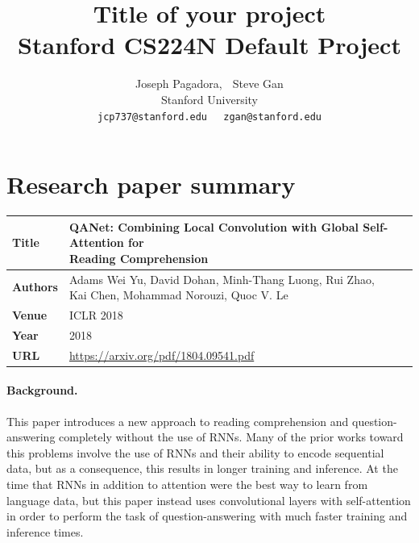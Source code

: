\documentclass{article}
\title{
  Title of your project \\
  \vspace{1em}
  \small{\normalfont Stanford CS224N Default Project}  %
}
\author{
  Joseph Pagadora, $\;$ Steve Gan \\
  Stanford University \\
  \texttt{jcp737@stanford.edu}$\;\;\;\;$
  \texttt{zgan@stanford.edu} \\
}
\begin{document}
\maketitle


\section{Research paper summary}

\begin{table}[h]
    \centering
    \begin{tabular}{ll}
        \toprule
        \textbf{Title} & \makecell{QANet: Combining Local Convolution with Global Self-Attention for \\ Reading Comprehension} \\
        \midrule
        \textbf{Authors} & \makecell{Adams Wei Yu, David Dohan, Minh-Thang Luong, Rui Zhao, \\ Kai Chen, Mohammad Norouzi, Quoc V. Le} \\
        \textbf{Venue} & ICLR 2018 \\
        \textbf{Year}  & 2018 \\
        \textbf{URL}   & \url{https://arxiv.org/pdf/1804.09541.pdf} \\
        \bottomrule
    \end{tabular}
    \vspace{1em}
\end{table}

\paragraph{Background.}
This paper introduces a new approach to reading comprehension and question-answering completely without the use of RNNs. Many of the prior works toward this problems involve the use of RNNs and their ability to encode sequential data, but as a consequence, this results in longer training and inference. At the time that RNNs in addition to attention were the best way to learn from language data, but this paper instead uses convolutional layers with self-attention in order to perform the task of question-answering with much faster training and inference times.
\end{document}

